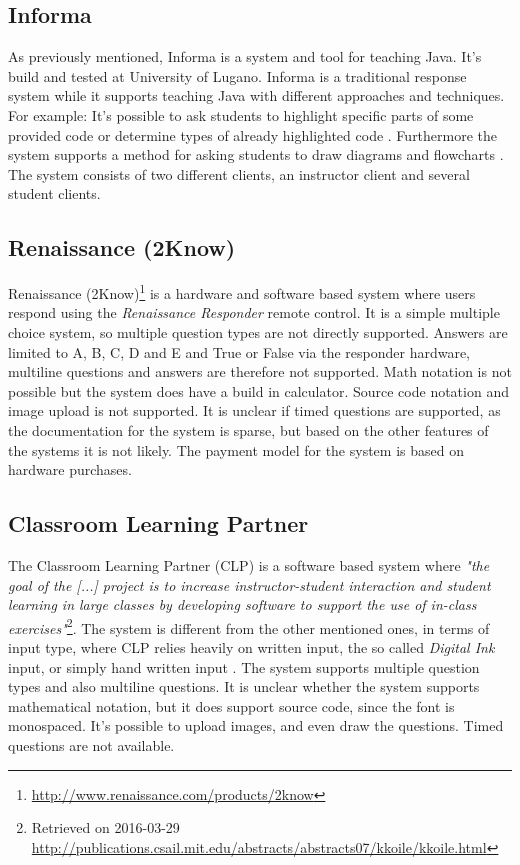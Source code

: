 \subsection*{Informa}
As previously mentioned, Informa is a system and tool for teaching Java. It's build and tested at University of Lugano. Informa is a traditional response system while it supports teaching Java with different approaches and techniques. For example: It's possible to ask students to highlight specific parts of some provided code or determine types of already highlighted code \cite[p.~2]{Hauswirth09}. Furthermore the system supports a method for asking students to draw diagrams and flowcharts \cite[p.~3]{Hauswirth09}. 
The system consists of two different clients, an instructor client and several student clients. 

\subsection*{Renaissance (2Know)}
Renaissance (2Know)\footnote{\url{http://www.renaissance.com/products/2know}} is a hardware and software based system where users respond using the \emph{Renaissance Responder} remote control. It is a simple multiple choice system, so multiple question types are not directly supported. Answers are limited to A, B, C, D and E and True or False via the responder hardware, multiline questions and answers are therefore not supported. Math notation is not possible but the system does have a build in calculator. Source code notation and image upload is not supported. It is unclear if timed questions are supported, as the documentation for the system is sparse, but based on the other features of the systems it is not likely. The payment model for the system is based on hardware purchases.

\subsection*{Classroom Learning Partner}
The Classroom Learning Partner (CLP) is a software based system where \emph{"the goal of the [...] project is to increase instructor-student interaction and student learning in large classes by developing software to support the use of in-class exercises"}\footnote{Retrieved on 2016-03-29 \url{http://publications.csail.mit.edu/abstracts/abstracts07/kkoile/kkoile.html}}. The system is different from the other mentioned ones, in terms of input type, where CLP relies heavily on written input, the so called \emph{Digital Ink} input, or simply hand written input \cite{koile2007supporting}. The system supports multiple question types and also multiline questions. It is unclear whether the system supports mathematical notation, but it does support source code, since the font is monospaced. It's possible to upload images, and even draw the questions. Timed questions are not available.


